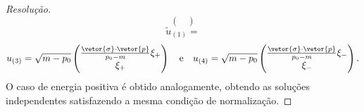 \begin{proof}[Resolução]
\begin{equation*}
\begin{pmatrix}
        \end{pmatrix}
    \end{equation*}
    \begin{equation*}
        \tilde{u}_{(1)} = 
    \end{equation*}
    \begin{equation*}
        u_{(3)} = \sqrt{m - p_0}\begin{pmatrix}
            \frac{\vetor{\sigma}\cdot\vetor{p}}{p_0 - m} \xi_+\\
            \xi_+
        \end{pmatrix}
        \quad\text{e}\quad
        u_{(4)} = \sqrt{m - p_0}\begin{pmatrix}
            \frac{\vetor{\sigma}\cdot\vetor{p}}{p_0 - m} \xi_-\\
            \xi_-
        \end{pmatrix}.
    \end{equation*}
    O caso de energia positiva é obtido analogamente, obtendo as soluções independentes
    satisfazendo a mesma condição de normalização.
\end{proof}
